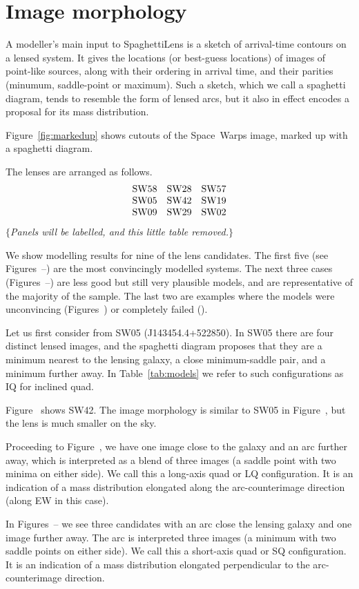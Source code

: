 \section{Image morphology}\label{sec:morph}

A modeller's main input to SpaghettiLens is a sketch of arrival-time
contours on a lensed system.  It gives the locations (or best-guess
locations) of images of point-like sources, along with their ordering
in arrival time, and their parities (minumum, saddle-point or
maximum).  Such a sketch, which we call a spaghetti diagram, tends to
resemble the form of lensed arcs, but it also in effect 
encodes a proposal for its mass distribution.

Figure~\ref{fig:markedup} shows cutouts of the Space~Warps image,
marked up with a spaghetti diagram.

The lenses are arranged as follows.
$$
\begin{matrix}
\rm SW58 & \rm SW28 & \rm SW57 \\
\rm SW05 & \rm SW42 & \rm SW19 \\
\rm SW09 & \rm SW29 & \rm SW02
\end{matrix}
$$ 
$\{${\em Panels will be labelled, and this little table removed.}$\}$

We show modelling results for nine of the lens candidates.  The first
five (see Figures~--) are the most
convincingly modelled systems.  The next three cases
(Figures~--) are less good but still very
plausible models, and are representative of the majority of the
sample.  The last two are examples where the models were unconvincing
(Figures~) or completely failed ().


Let us first consider from SW05 (J143454.4+522850).
In SW05 there are four distinct lensed images, and the spaghetti
diagram proposes that they are a minimum nearest to the lensing
galaxy, a close minimum-saddle pair, and a minimum further away. In
Table~\ref{tab:models} we refer to such configurations as IQ for
inclined quad.

Figure~ shows SW42.  The image morphology is similar to
SW05 in Figure~, but the lens is much smaller on the sky.

Proceeding to Figure~, we have one image close to the
galaxy and an arc further away, which is interpreted as a blend of
three images (a saddle point with two minima on either side).  We call
this a long-axis quad or LQ configuration.  It is an indication of a
mass distribution elongated along the arc-counterimage direction
(along EW in this case).

In Figures~-- we see three candidates with
an arc close the lensing galaxy and one image further away.  The arc
is interpreted three images (a minimum with two saddle points on
either side).  We call this a short-axis quad or SQ configuration.  It
is an indication of a mass distribution elongated perpendicular to the
arc-counterimage direction.

